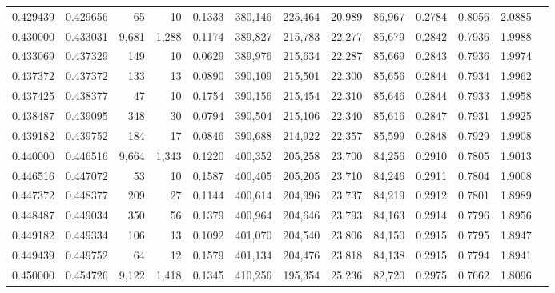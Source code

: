 \begin{tabular}{rrrrrrrrrrrrr}
0.429439 & 0.429656 &     65 &    10 &                                     0.1333 & 380,146 & 225,464 &  20,989 &  86,967 & 0.2784 & 0.8056 & 2.0885 \\
0.430000 & 0.433031 &  9,681 & 1,288 &                                     0.1174 & 389,827 & 215,783 &  22,277 &  85,679 & 0.2842 & 0.7936 & 1.9988 \\
0.433069 & 0.437329 &    149 &    10 &                                     0.0629 & 389,976 & 215,634 &  22,287 &  85,669 & 0.2843 & 0.7936 & 1.9974 \\
0.437372 & 0.437372 &    133 &    13 &                                     0.0890 & 390,109 & 215,501 &  22,300 &  85,656 & 0.2844 & 0.7934 & 1.9962 \\
0.437425 & 0.438377 &     47 &    10 &                                     0.1754 & 390,156 & 215,454 &  22,310 &  85,646 & 0.2844 & 0.7933 & 1.9958 \\
0.438487 & 0.439095 &    348 &    30 &                                     0.0794 & 390,504 & 215,106 &  22,340 &  85,616 & 0.2847 & 0.7931 & 1.9925 \\
0.439182 & 0.439752 &    184 &    17 &                                     0.0846 & 390,688 & 214,922 &  22,357 &  85,599 & 0.2848 & 0.7929 & 1.9908 \\
0.440000 & 0.446516 &  9,664 & 1,343 &                                     0.1220 & 400,352 & 205,258 &  23,700 &  84,256 & 0.2910 & 0.7805 & 1.9013 \\
0.446516 & 0.447072 &     53 &    10 &                                     0.1587 & 400,405 & 205,205 &  23,710 &  84,246 & 0.2911 & 0.7804 & 1.9008 \\
0.447372 & 0.448377 &    209 &    27 &                                     0.1144 & 400,614 & 204,996 &  23,737 &  84,219 & 0.2912 & 0.7801 & 1.8989 \\
0.448487 & 0.449034 &    350 &    56 &                                     0.1379 & 400,964 & 204,646 &  23,793 &  84,163 & 0.2914 & 0.7796 & 1.8956 \\
0.449182 & 0.449334 &    106 &    13 &                                     0.1092 & 401,070 & 204,540 &  23,806 &  84,150 & 0.2915 & 0.7795 & 1.8947 \\
0.449439 & 0.449752 &     64 &    12 &                                     0.1579 & 401,134 & 204,476 &  23,818 &  84,138 & 0.2915 & 0.7794 & 1.8941 \\
0.450000 & 0.454726 &  9,122 & 1,418 &                                     0.1345 & 410,256 & 195,354 &  25,236 &  82,720 & 0.2975 & 0.7662 & 1.8096 \\

\end{tabular}
